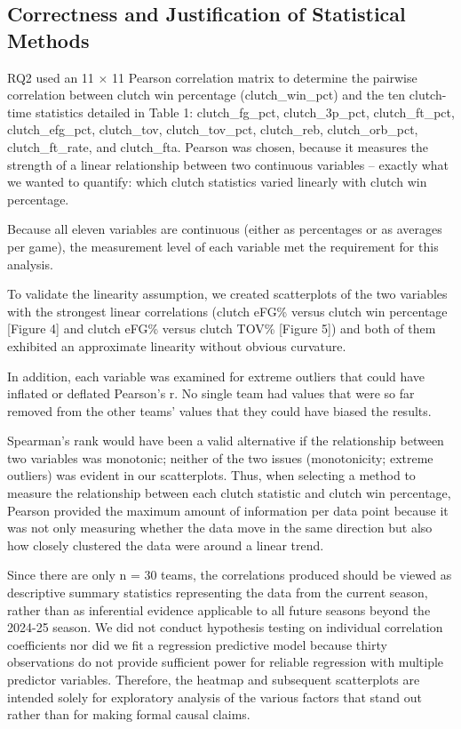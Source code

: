 \subsection{Correctness and Justification of Statistical Methods}

\begin{sloppypar}
RQ2 used an 11 $\times$ 11 Pearson correlation matrix to determine the pairwise correlation between clutch win percentage (clutch\_win\_pct) and the ten clutch-time statistics detailed in Table 1: clutch\_fg\_pct, clutch\_3p\_pct, clutch\_ft\_pct, clutch\_efg\_pct, clutch\_tov, clutch\_tov\_pct, clutch\_reb, clutch\_orb\_pct, clutch\_ft\_rate, and clutch\_fta. Pearson was chosen, because it measures the strength of a linear relationship between two continuous variables -- exactly what we wanted to quantify: which clutch statistics varied linearly with clutch win percentage.

Because all eleven variables are continuous (either as percentages or as averages per game), the measurement level of each variable met the requirement for this analysis.

To validate the linearity assumption, we created scatterplots of the two variables with the strongest linear correlations (clutch eFG\% versus clutch win percentage [Figure 4] and clutch eFG\% versus clutch TOV\% [Figure 5]) and both of them exhibited an approximate linearity without obvious curvature.

In addition, each variable was examined for extreme outliers that could have inflated or deflated Pearson's r. No single team had values that were so far removed from the other teams' values that they could have biased the results.

Spearman's rank would have been a valid alternative if the relationship between two variables was monotonic; neither of the two issues (monotonicity; extreme outliers) was evident in our scatterplots. Thus, when selecting a method to measure the relationship between each clutch statistic and clutch win percentage, Pearson provided the maximum amount of information per data point because it was not only measuring whether the data move in the same direction but also how closely clustered the data were around a linear trend.

Since there are only n = 30 teams, the correlations produced should be viewed as descriptive summary statistics representing the data from the current season, rather than as inferential evidence applicable to all future seasons beyond the 2024-25 season. We did not conduct hypothesis testing on individual correlation coefficients nor did we fit a regression predictive model because thirty observations do not provide sufficient power for reliable regression with multiple predictor variables. Therefore, the heatmap and subsequent scatterplots are intended solely for exploratory analysis of the various factors that stand out rather than for making formal causal claims.
\end{sloppypar}

